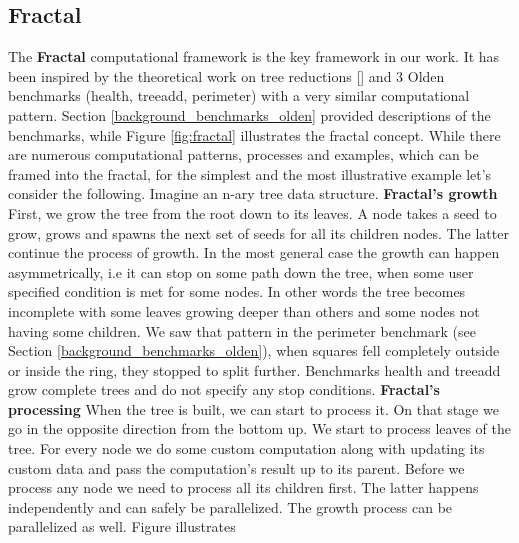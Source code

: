 \subsection{Fractal}
\label{frameworks_fractal}
\quad The \textbf{Fractal} computational framework is the key framework in our work. It has been inspired by the theoretical work on tree reductions [] and 3 Olden benchmarks (health, treeadd, perimeter) with a very similar computational pattern. Section \ref{background_benchmarks_olden} provided descriptions of the benchmarks, while Figure \ref{fig:fractal} illustrates the fractal concept.\newline\null
\quad While there are numerous computational patterns, processes and examples, which can be framed into the fractal, for the simplest and the most illustrative example let's consider the following. Imagine an n-ary tree data structure.\newline\null
\textbf{Fractal's growth}
First, we grow the tree from the root down to its leaves. A node takes a seed to grow, grows and spawns the next set of seeds for all its children nodes. The latter continue the process of growth. In the most general case the growth can happen asymmetrically, i.e it can stop on some path down the tree, when some user specified condition is met for some nodes. In other words the tree becomes incomplete with some leaves growing deeper than others and some nodes not having some children. We saw that pattern in the perimeter benchmark (see Section \ref{background_benchmarks_olden}), when squares fell completely outside or inside the ring, they stopped to split further. Benchmarks health and treeadd grow complete trees and do not specify any stop conditions.\newline\null
\textbf{Fractal's processing} When the tree is built, we can start to process it. On that stage we go in the opposite direction from the bottom up. We start to process leaves of the tree. For every node we do some custom computation along with updating its custom data and pass the computation's result up to its parent. Before we process any node we need to process all its children first. The latter happens independently and can safely be parallelized. The growth process can be parallelized as well.\newline\null
\quad Figure illustrates 


